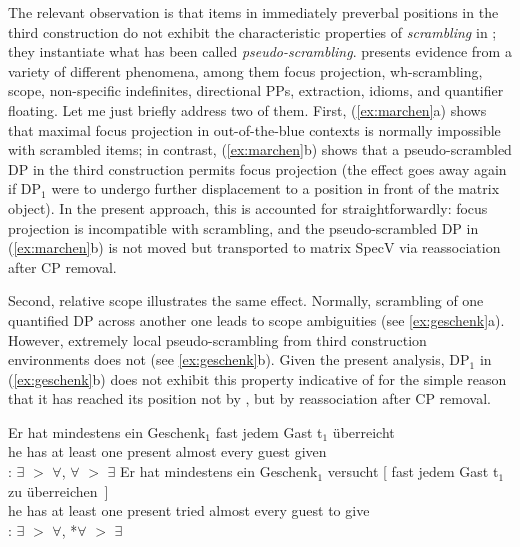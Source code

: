 \documentclass[output=paper]{langsci/langscibook}
\begin{document}
The relevant observation is that items in immediately preverbal positions in
the third construction do not exhibit the characteristic properties of {\it
scrambling} in ; they instantiate what has been called  {\it
pseudo-scrambling}.  \citet{Geilfuss:91} presents evidence  from a variety of
different phenomena, among them focus projection, wh-scrambling, scope,
non-specific indefinites, directional PPs, extraction, idioms, and quantifier
floating. Let me just briefly address two of them. First, (\ref{ex:marchen}a) shows that
maximal focus projection in out-of-the-blue contexts is normally impossible
with scrambled items; in contrast, (\ref{ex:marchen}b) shows that a pseudo-scrambled DP
in the third construction permits focus projection (the effect goes away again
if DP$_1$ were to undergo further displacement to a position in front of the
matrix object). In the present approach, this is accounted for
straightforwardly: focus projection is incompatible with scrambling, and the
pseudo-scrambled DP in (\ref{ex:marchen}b) is not moved but transported to
matrix SpecV via reassociation after CP removal.

\ea\label{ex:marchen} 
    \z
\z

Second, relative scope illustrates the same effect. Normally, scrambling of one
quantified DP across another one leads to scope ambiguities (see
\ref{ex:geschenk}a). However, extremely local pseudo-scrambling from third
construction environments does not (see \ref{ex:geschenk}b). Given the
present analysis, DP$_1$ in (\ref{ex:geschenk}b) does not exhibit this property
indicative of  for the simple reason that it has reached its position
not by , but by reassociation after CP removal.

\ea\label{ex:geschenk} 
    \ea
    \gll Er hat mindestens ein Geschenk$_1$ fast jedem Gast t$_1$ überreicht\\
        he\textsubscript{\Nom} has {at least} one present\textsubscript{\Acc} almost every guest\textsubscript{\Dat} {} given\\
    : $\exists$ $>$ $\forall$, $\forall$ $>$ $\exists$
    \ex
    \gll Er hat mindestens ein Geschenk$_1$ versucht [ fast jedem Gast t$_1$ zu überreichen~]\\
        he\textsubscript{\Nom} has {at least} one present\textsubscript{\Acc} tried {} almost every guest {} to give\\
    : $\exists$ $>$ $\forall$, *$\forall$ $>$ $\exists$
    \z
\z
\end{document}
